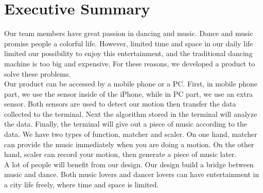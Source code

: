 \newpage
\section{Executive Summary}

Our team members have great passion in dancing and music. Dance and music
promise people a colorful life. However, limited time and space in our daily
life limited our possibility to enjoy this entertainment, and the traditional
dancing machine is too big and expensive. For these reasons, we developed a
product to solve these problems. \\ 

Our product can be accessed by a mobile phone or a PC. First, in mobile phone
part, we use the sensor inside of the iPhone, while in PC part, we use an extra
sensor. Both sensors are used to detect our motion then transfer the data
collected to the terminal. Next the algorithm stored in the terminal will
analyze the data. Finally, the terminal will give out a piece of music according
to the data. We have two types of function, matcher and scaler. On one hand,
matcher can provide the music immediately when you are doing a motion. On the
other hand, scaler can record your motion, then generate a piece of music later.
\\ 

A lot of people will benefit from our design. Our design build a bridge between
music and dance. Both music lovers and dancer lovers can have entertainment in a
city life freely, where time and space is limited. 
